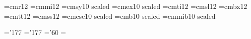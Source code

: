 \def\xipt{\ifmmode\err@badsizechange\else
     \@mathfontinit
     \textfont0=\xiptrm  \scriptfont0=\viiiptrm  \scriptscriptfont0=\viptrm
     \textfont1=\xiptmit \scriptfont1=\viiiptmit \scriptscriptfont1=\viptmit
     \textfont2=\xiptsy  \scriptfont2=\viiiptsy  \scriptscriptfont2=\viptsy
     \textfont3=\xiptex  \scriptfont3=\xptex     \scriptscriptfont3=\xptex
     \textfont\itfam=\xiptit
     \scriptfont\itfam=\viiiptit
     \scriptscriptfont\itfam=\viiptit
     \textfont\bffam=\xiptbf
     \scriptfont\bffam=\viiiptbf
     \scriptscriptfont\bffam=\viptbf
     \@fontstyleinit
     \def\rm{\xiptrm\fam=\z@}%
     \def\it{\xiptit\fam=\itfam}%
     \def\sl{\xiptsl}%
     \def\bf{\xiptbf\fam=\bffam}%
     \def\tt{\xipttt}%
     \def\ss{\xiptss}%
     \def\oldstyle{\xiptmit\fam=\@ne}%
     \rm\fi}


\font\xiiptrm=cmr12
\font\xiiptmit=cmmi12
\font\xiiptsy=cmsy10  scaled
\font\xiiptex=cmex10  scaled
\font\xiiptit=cmti12
\font\xiiptsl=cmsl12
\font\xiiptbf=cmbx12
\font\xiipttt=cmtt12
\font\xiiptss=cmss12
\font\xiiptsc=cmcsc10 scaled
\font\xiiptbfs=cmb10  scaled
\font\xiiptbmit=cmmib10 scaled

\skewchar\xiiptmit='177 \skewchar\xiiptbmit='177 \skewchar\xiiptsy='60
 \xiiptsy=\the{} \xiiptsy

\def\xiipt{\ifmmode\err@badsizechange\else
     \@mathfontinit
     \textfont0=\xiiptrm  \scriptfont0=\viiiptrm  \scriptscriptfont0=\viptrm
     \textfont1=\xiiptmit \scriptfont1=\viiiptmit \scriptscriptfont1=\viptmit
     \textfont2=\xiiptsy  \scriptfont2=\viiiptsy  \scriptscriptfont2=\viptsy
     \textfont3=\xiiptex  \scriptfont3=\xptex     \scriptscriptfont3=\xptex
     \textfont\itfam=\xiiptit
     \scriptfont\itfam=\viiiptit
     \scriptscriptfont\itfam=\viiptit
     \textfont\bffam=\xiiptbf
     \scriptfont\bffam=\viiiptbf
     \scriptscriptfont\bffam=\viptbf
     \textfont\bfsfam=\xiiptbfs
     \scriptfont\bfsfam=\viiiptbf
     \scriptscriptfont\bfsfam=\viptbf
     \textfont\bmitfam=\xiiptbmit
     \scriptfont\bmitfam=\viiiptmit
     \scriptscriptfont\bmitfam=\viptmit
     \@fontstyleinit
     \def\rm{\xiiptrm\fam=\z@}%
     \def\it{\xiiptit\fam=\itfam}%
     \def\sl{\xiiptsl}%
     \def\bf{\xiiptbf\fam=\bffam}%
     \def\tt{\xiipttt}%
     \def\ss{\xiiptss}%
     \def\sc{\xiiptsc}%
     \def\bfs{\xiiptbfs\fam=\bfsfam}%
     \def\bmit{\fam=\bmitfam}%
     \def\oldstyle{\xiiptmit\fam=\@ne}%
     \rm\fi}

